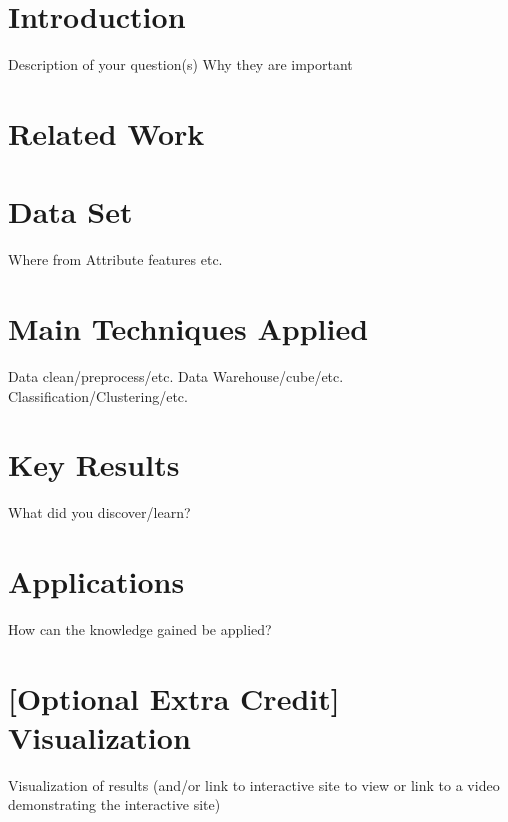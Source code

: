 



\section{Introduction} 
 Description of your question(s) Why they are important
\section{Related Work}
\section{Data Set}
Where from
Attribute features
etc.
\section{Main Techniques Applied}
Data clean/preprocess/etc.
Data Warehouse/cube/etc.
Classification/Clustering/etc.
\section{Key Results}
What did you discover/learn?
\section{Applications}
How can the knowledge gained be applied?
\section{ [Optional Extra Credit] Visualization}
Visualization of results (and/or link to interactive site to view or link to a video
demonstrating the interactive site)






